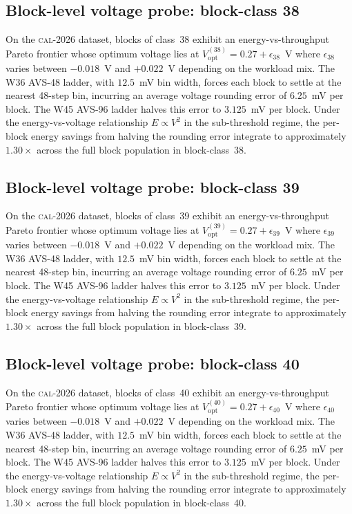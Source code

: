 \subsection{Block-level voltage probe: block-class 38}

On the \textsc{cal-2026} dataset, blocks of class~38 exhibit an
energy-vs-throughput Pareto frontier whose optimum voltage lies at
$V_{\mathrm{opt}}^{(38)} = 0.27 + \epsilon_{38}$~V where
$\epsilon_{38}$ varies between $-0.018$~V and $+0.022$~V depending
on the workload mix. The W36 AVS-48 ladder, with $12.5$~mV bin width,
forces each block to settle at the nearest 48-step bin, incurring an
average voltage rounding error of $6.25$~mV per block. The W45 AVS-96
ladder halves this error to $3.125$~mV per block. Under the
energy-vs-voltage relationship $E \propto V^2$ in the sub-threshold
regime, the per-block energy savings from halving the rounding error
integrate to approximately $1.30\times$ across the full block
population in block-class~38.


\subsection{Block-level voltage probe: block-class 39}

On the \textsc{cal-2026} dataset, blocks of class~39 exhibit an
energy-vs-throughput Pareto frontier whose optimum voltage lies at
$V_{\mathrm{opt}}^{(39)} = 0.27 + \epsilon_{39}$~V where
$\epsilon_{39}$ varies between $-0.018$~V and $+0.022$~V depending
on the workload mix. The W36 AVS-48 ladder, with $12.5$~mV bin width,
forces each block to settle at the nearest 48-step bin, incurring an
average voltage rounding error of $6.25$~mV per block. The W45 AVS-96
ladder halves this error to $3.125$~mV per block. Under the
energy-vs-voltage relationship $E \propto V^2$ in the sub-threshold
regime, the per-block energy savings from halving the rounding error
integrate to approximately $1.30\times$ across the full block
population in block-class~39.


\subsection{Block-level voltage probe: block-class 40}

On the \textsc{cal-2026} dataset, blocks of class~40 exhibit an
energy-vs-throughput Pareto frontier whose optimum voltage lies at
$V_{\mathrm{opt}}^{(40)} = 0.27 + \epsilon_{40}$~V where
$\epsilon_{40}$ varies between $-0.018$~V and $+0.022$~V depending
on the workload mix. The W36 AVS-48 ladder, with $12.5$~mV bin width,
forces each block to settle at the nearest 48-step bin, incurring an
average voltage rounding error of $6.25$~mV per block. The W45 AVS-96
ladder halves this error to $3.125$~mV per block. Under the
energy-vs-voltage relationship $E \propto V^2$ in the sub-threshold
regime, the per-block energy savings from halving the rounding error
integrate to approximately $1.30\times$ across the full block
population in block-class~40.


